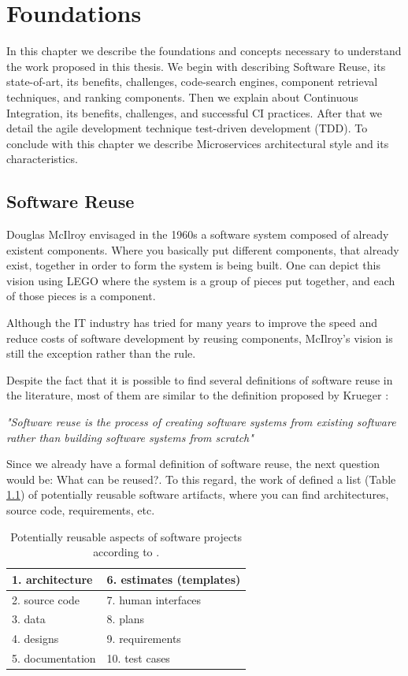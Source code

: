 \chapter{Foundations}
\label{foundations}
In this chapter we describe the foundations and concepts necessary to understand the work proposed in this thesis. We begin with describing Software Reuse, its state-of-art, its benefits, challenges, code-search engines, component retrieval techniques, and ranking components. Then we explain about Continuous Integration, its benefits, challenges, and successful CI practices. After that we detail the agile development technique test-driven development (TDD). To conclude with this chapter we describe Microservices architectural style and its characteristics.
\section{Software Reuse}
\label{chap:sw-reuse}
Douglas McIlroy \cite{McIlroy1968} envisaged in the 1960s a software system composed of already existent components. Where you basically put different components, that already exist, together in order to form the system is being built. One can depict this vision using LEGO where the system is a group of pieces put together, and each of those pieces is a component.

Although the IT industry has tried for many years to improve the speed and reduce costs of software development by reusing components, McIlroy's vision is still the exception rather than the rule.

Despite the fact that it is possible to find several definitions of software reuse in the literature, most of them are similar to the definition proposed by Krueger \cite{Krueger1992}:

\textit{"Software reuse is the process of creating software systems from existing software rather than building software systems from scratch"}

Since we already have a formal definition of software reuse, the next question would be: What can be reused?. To this regard, the work of \citeauthor{Frakes1996} defined a list (Table \ref{reusable-list}) of potentially reusable software artifacts, where you can find architectures, source code, requirements, etc.

\begin{table}[]
\centering
\label{reusable-list}
	\begin{tabular}{|l|l|}
		\hline
		1. architecture						 & 6. estimates (templates) \\ \hline
		2. source code  						 & 7. human interfaces      \\ \hline
		3. data                               & 8. plans                 \\ \hline
		4. designs                            & 9. requirements          \\ \hline
		5. documentation                      & 10. test cases           \\ \hline
	\end{tabular}
	\caption{Potentially reusable aspects of software projects according to \cite{Frakes1996}.}
\end{table}

